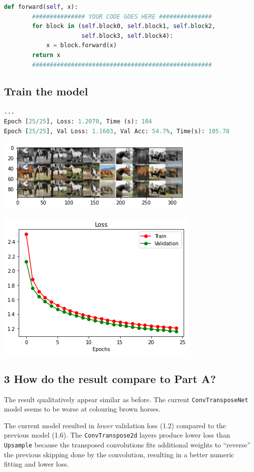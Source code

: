 \documentclass{article}
\begin{document}
\begin{lstlisting}[language=Python]
    def forward(self, x):
        ############### YOUR CODE GOES HERE ###############
        for block in (self.block0, self.block1, self.block2, 
                      self.block3, self.block4):
            x = block.forward(x)
        return x
        ###################################################
\end{lstlisting}

\subsection*{Train the model}


\begin{lstlisting}[language=Python]
...
Epoch [25/25], Loss: 1.2070, Time (s): 104
Epoch [25/25], Val Loss: 1.1603, Val Acc: 54.7%, Time(s): 105.78
\end{lstlisting}

\includegraphics{B2.1.png}

\includegraphics{B2.2.png}


\subsection*{3 How do the result compare to Part A?}

The result qualitatively appear similar as before. The current \texttt{ConvTransposeNet} model seems to be worse at colouring brown horses.

The current model resulted in \emph{lower} validation loss (1.2) compared to the previous model (1.6). The \texttt{ConvTranspose2d} layers produce lower loss than \texttt{Upsample} because the transposed convolutions fits additional weights to ``reverse'' the previous skipping done by the convolution, resulting in a better numeric fitting and lower loss. 
\end{document}
